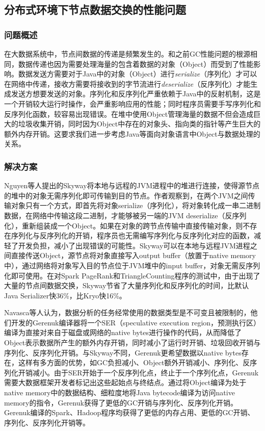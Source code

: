 \documentclass[lang=cn,12pt,a4paper,cite=authoryear]{elegantpaper}
\begin{document}
\subsection{分布式环境下节点数据交换的性能问题}
\subsubsection{问题概述}
在大数据系统中，节点间数据的传递是频繁发生的。和之前GC性能问题的根源相同，数据传递也因为需要处理海量的包含着数据的对象（Object）而受到了性能影响。数据发送方需要对于Java中的对象（Object）进行\textit{serialize}（序列化）才可以在网络中传递，接收方需要将接收到的字节流进行\textit{deserialize}（反序列化）才能生成发送方想要发送的对象。序列化和反序列化严重依赖于Java中的反射机制，这是一个开销较大运行时操作，会严重影响应用的性能；同时程序员需要手写序列化和反序列化函数，较容易出现错误。在堆中使用Object管理海量的数据不但会造成巨大的垃圾收集开销，同时因为Object中存在的对象头、指向类的指针等产生巨大的额外内存开销。这要求我们进一步考虑Java等面向对象语言中Object与数据处理的关系。

\subsubsection{解决方案}
Nguyen等人提出的Skyway\cite{DBLP:conf/asplos/NguyenFNXDL18}将本地与远程的JVM进程中的堆进行连接，使得源节点的堆中的对象无需序列化即可传输到目的节点。作者观察到，在两个JVM之间传输对象只有一个方式，即首先将对象serialize（序列化），将对象转化成一串二进制数据，在网络中传输这段二进制，才能够被另一端的JVM deserialize（反序列化），重新组装成一个Object。如果在对象的跨节点传输中直接传输对象，则不存在序列化与反序列化的开销，程序员也无需编写序列化与反序列化对应的函数，减轻了开发负担，减小了出现错误的可能性。Skyway可以在本地与远程JVM进程之间直接传送Object，源节点将对象直接写入output buffer（放置于native memory中），通过网络将对象写入目的节点位于JVM堆中的input buffer，对象无需反序列化即可使用。在对Spark PageRank和TriangleCounting程序的测试中，由于出现了大量的节点间数据交换，Skyway节省了大量序列化和反序列化的时间，比默认Java Serializer快36\%，比Kryo\cite{kyro}快16\%。

Navasca等人认为，数据分析的任务经常使用的数据类型是不可变且被限制的，他们开发的Gerenuk\cite{DBLP:conf/sosp/NavascaCNDLKX19}编译器将一个SER（speculative execution region，预测执行区）编译为直接对来自于磁盘或网络的native bytes进行操作的代码，从而降低了Object表示数据所产生的额外内存开销，同时减小了运行时开销、垃圾回收开销与序列化、反序列化开销。与Skyway不同，Gerenuk更希望数据以native bytes存在，这样有多方面的优势，如GC负担减小、Object额外开销减小、序列化、反序列化开销减小。由于SER开始于一个反序列化点，终止于一个序列化点，Gerenuk需要大数据框架开发者标记出这些起始点与终结点。通过将Object编译为处于native memory中的数据结构、细粒度地将Java bytecode编译为访问native memory的指令，Gerenuk获得了更低的GC开销与序列化、反序列化开销。Gerenuk编译的Spark、Hadoop程序均获得了更低的内存占用、更低的GC开销、序列化、反序列化开销等。
\end{document}
